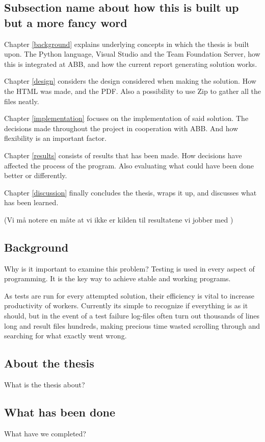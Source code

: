 \documentclass{article}
\begin{document}
	
	\subsection{Subsection name about how this is built up but a more fancy word}
	Chapter \ref{background} explains underlying concepts in which the thesis is built upon. The Python language, Visual Studio and the Team Foundation Server, how this is integrated at ABB, and how the current report generating solution works.
	
	Chapter \ref{design} considers the design considered when making the solution. How the HTML was made, and the PDF. Also a possibility to use Zip to gather all the files neatly. 
	
	Chapter \ref{implementation} focuses on the implementation of said solution. The decisions made throughout the project in cooperation with ABB. And how flexibility is an important factor.
	
	Chapter \ref{results} consists of results that has been made. How decisions have affected the process of the program. Also evaluating what could have been done better or differently. 
	
	Chapter \ref{discussion} finally concludes the thesis, wraps it up, and discusses what has been learned. 
	
	(Vi må notere en måte at vi ikke er kilden til resultatene vi jobber med	)
	\iffalse
	\subsection{Background}
	Why is it important to examine this problem?
	\linebreak
	\linebreak
	Testing is used in every aspect of programming. It is the key way to achieve stable and working programs. 
	
	As tests are run for every attempted solution, their efficiency is vital to increase productivity of workers. Currently its simple to recognize if everything is as it should, but in the event of a test failure log-files often turn out thousands of lines long and result files hundreds, making precious time wasted scrolling through and searching for what exactly went wrong.
	
	\subsection{About the thesis}
	What is the thesis about?
	\subsection{What has been done}
	What have we completed?
\end{document}
